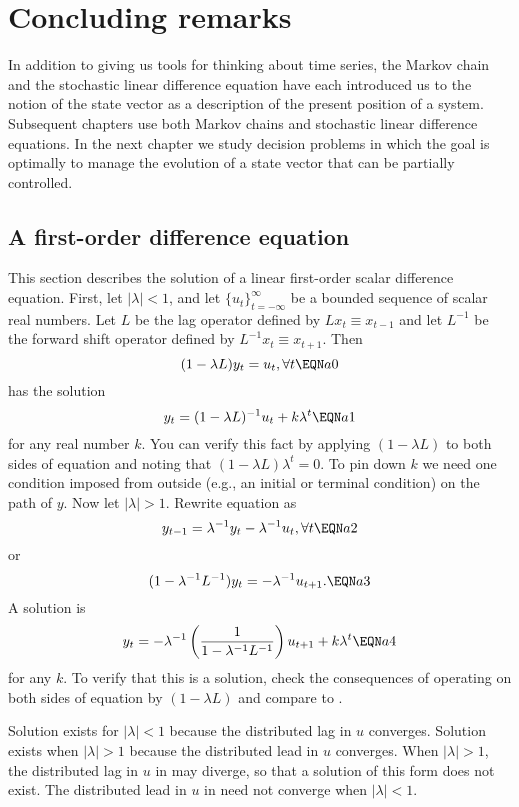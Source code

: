 \section{Concluding remarks}\label{concl1}%
In addition to giving us tools for thinking about time series, the
Markov chain and the stochastic linear difference equation have
each introduced us to the notion of the state vector as a
description of the present position of a system. %
 Subsequent chapters use both
Markov chains and stochastic linear difference equations. In the
next chapter we study decision problems in which the goal is
optimally to manage the evolution of a state vector that can be
partially controlled.


\medskip
{}\label{appa1}%
\subsection{A first-order difference equation}
This section describes the solution of a linear
first-order scalar difference equation.
First, let $ |\lambda | < 1$, and let $\{u_t\}_{t=-\infty}^\infty$ be a
bounded sequence  of scalar real numbers. Let $L$ be the
lag operator defined by $L x_t \equiv x_{t-1}$ and
let $L^{-1}$ be the forward shift operator defined by $L^{-1} x_t \equiv x_{t+1}$.
Then $$(1 - \lambda L) y_t = u_t, \forall t \EQN a0 $$
has the solution
$$y_t = (1 -\lambda L)^{-1} u_t +k \lambda^t \EQN a1$$ for
any real number $k$.  You can verify this fact by applying
$(1-\lambda L)$ to both sides  of equation  and noting
that $(1 - \lambda L) \lambda^t =0$.
To pin down $k$ we need one condition imposed from outside
(e.g., an initial or terminal condition)
on the path of $y$.
\medskip
Now let $| \lambda | > 1$.   Rewrite equation  as
$$ y_{t-1} = \lambda^{-1} y_t - \lambda^{-1} u_t , \forall t \EQN a2 $$
or
$$ (1 - \lambda^{-1} L^{-1}) y_t = - \lambda^{-1} u_{t+1}. \EQN a3 $$
A solution is
$$ y_t = - \lambda^{-1}\left({ 1 \over  1 - \lambda^{-1} L^{-1}} \right)
        u_{t+1} + k \lambda^t \EQN a4  $$
for any $k$.  To verify that  this is a solution,
check the consequences of operating on both sides of equation 
by $(1 -\lambda L)$ and compare to  .

\medskip
Solution  exists for $|\lambda  | < 1$ because the
distributed lag in $u$ converges.  Solution    exists
when $|\lambda| > 1$ because the distributed lead in $u$ converges.
When $|\lambda | > 1$, the distributed lag in $u$ in  may
diverge, so that a solution of this form does not exist.
The distributed lead in $u$ in  need not converge
when $|\lambda| < 1$.


